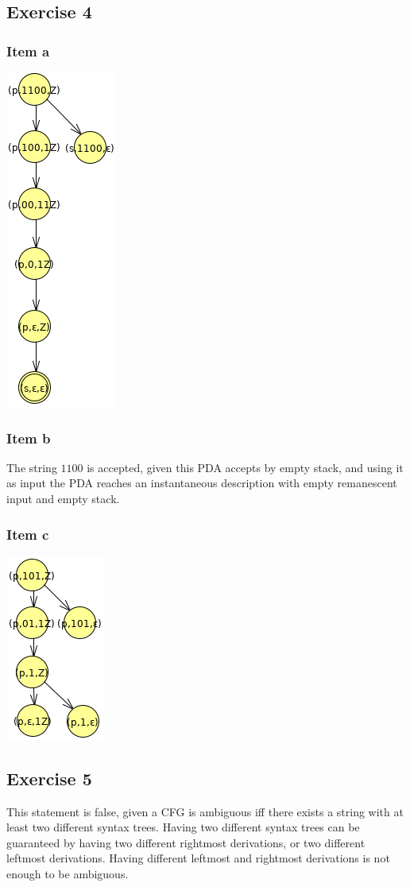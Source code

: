 {\subsection{Exercise 4}
\subsubsection{Item a}
\begin{center} \includegraphics[scale=0.5]{TP09_4a} \end{center}
\subsubsection{Item b}
The string $1100$ is accepted, given this PDA accepts by empty stack, and using it as input the PDA reaches an instantaneous description with empty remanescent input and empty stack.
\subsubsection{Item c}
\begin{center} \includegraphics[scale=0.5]{TP09_4c} \end{center}
\subsection{Exercise 5}
This statement is false, given a CFG is ambiguous iff there exists a string with at least two different syntax trees. Having two different syntax trees can be guaranteed by having two different rightmost derivations, or two different leftmost derivations. Having different leftmost and rightmost derivations is not enough to be ambiguous.
}
